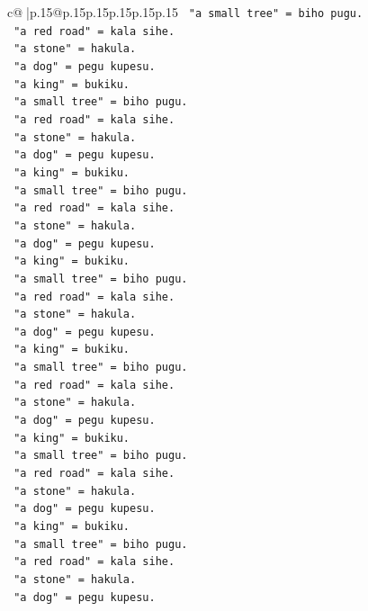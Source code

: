 \documentclass{article}
\begin{document}
{\begin{supertabular}{c@{$\;$}|p{.15\linewidth}@{}p{.15\linewidth}p{.15\linewidth}p{.15\linewidth}p{.15\linewidth}p{.15\linewidth}}
{{{\texttt{   "a small tree" = biho pugu.} \\
\texttt{   "a red road" = kala sihe.} \\
\texttt{   "a stone" = hakula.} \\
\texttt{   "a dog" = pegu kupesu.} \\
\texttt{   "a king" = bukiku.} \\
\texttt{   "a small tree" = biho pugu.} \\
\texttt{   "a red road" = kala sihe.} \\
\texttt{   "a stone" = hakula.} \\
\texttt{   "a dog" = pegu kupesu.} \\
\texttt{   "a king" = bukiku.} \\
\texttt{   "a small tree" = biho pugu.} \\
\texttt{   "a red road" = kala sihe.} \\
\texttt{   "a stone" = hakula.} \\
\texttt{   "a dog" = pegu kupesu.} \\
\texttt{   "a king" = bukiku.} \\
\texttt{   "a small tree" = biho pugu.} \\
\texttt{   "a red road" = kala sihe.} \\
\texttt{   "a stone" = hakula.} \\
\texttt{   "a dog" = pegu kupesu.} \\
\texttt{   "a king" = bukiku.} \\
\texttt{   "a small tree" = biho pugu.} \\
\texttt{   "a red road" = kala sihe.} \\
\texttt{   "a stone" = hakula.} \\
\texttt{   "a dog" = pegu kupesu.} \\
\texttt{   "a king" = bukiku.} \\
\texttt{   "a small tree" = biho pugu.} \\
\texttt{   "a red road" = kala sihe.} \\
\texttt{   "a stone" = hakula.} \\
\texttt{   "a dog" = pegu kupesu.} \\
\texttt{   "a king" = bukiku.} \\
\texttt{   "a small tree" = biho pugu.} \\
\texttt{   "a red road" = kala sihe.} \\
\texttt{   "a stone" = hakula.} \\
\texttt{   "a dog" = pegu kupesu.} \\
}}}
\end{supertabular}}
\end{document}
